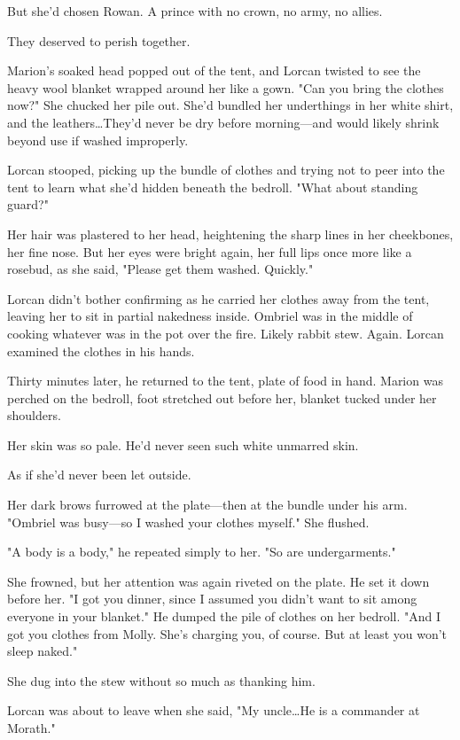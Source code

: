But she'd chosen Rowan.
A prince with no crown, no army, no allies.

They deserved to perish together.

Marion's soaked head popped out of the tent, and Lorcan twisted to see the heavy wool blanket wrapped around her like a gown.
"Can you bring the clothes now?"
She chucked her pile out.
She'd bundled her underthings in her white shirt, and the leathers\ldots They'd never be dry before morning---and would likely shrink beyond use if washed improperly.

Lorcan stooped, picking up the bundle of clothes and trying not to peer into the tent to learn what she'd hidden beneath the bedroll.
"What about standing guard?"

Her hair was plastered to her head, heightening the sharp lines in her cheekbones, her fine nose.
But her eyes were bright again, her full lips once more like a rosebud, as she said, "Please get them washed.
Quickly."

Lorcan didn't bother confirming as he carried her clothes away from the tent, leaving her to sit in partial nakedness inside.
Ombriel was in the middle of cooking whatever was in the pot over the fire.
Likely rabbit stew.
Again.
Lorcan examined the clothes in his hands.

Thirty minutes later, he returned to the tent, plate of food in hand.
Marion was perched on the bedroll, foot stretched out before her, blanket tucked under her shoulders.

Her skin was so pale.
He'd never seen such white unmarred skin.

As if she'd never been let outside.

Her dark brows furrowed at the plate---then at the bundle under his arm.
"Ombriel was busy---so I washed your clothes myself."
She flushed.

"A body is a body," he repeated simply to her.
"So are undergarments."

She frowned, but her attention was again riveted on the plate.
He set it down before her.
"I got you dinner, since I assumed you didn't want to sit among everyone in your blanket."
He dumped the pile of clothes on her bedroll.
"And I got you clothes from Molly.
She's charging you, of course.
But at least you won't sleep naked."

She dug into the stew without so much as thanking him.

Lorcan was about to leave when she said, "My uncle\ldots He is a commander at Morath."

